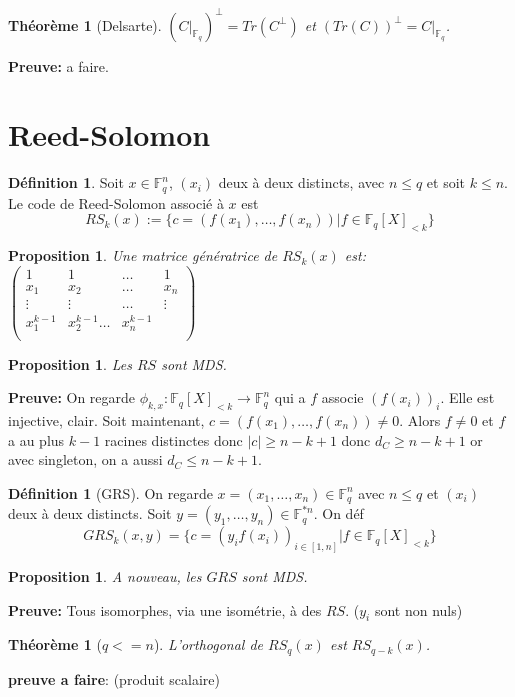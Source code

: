 \documentclass[12pt]{article}
\theoremstyle{plain}
\newtheorem{thm}[subsubsection]{Th\'eor\`eme}
\newtheorem{prop}[subsubsection]{Proposition}
\theoremstyle{definition}
\newtheorem{defn}[subsubsection]{D\'efinition}
\theoremstyle{remark}
\newcommand{\F}{\mathbb{F}}
\begin{document}
\begin{thm}[Delsarte]
    $(C|_{\F_q})^{\perp}=Tr(C^{\perp})$ et $(Tr(C))^{\perp}=C|_{\F_q}$.
\end{thm}
\textbf{Preuve:} a faire.

\section{Reed-Solomon}
\begin{defn}
    Soit $x\in \F_q^n$, $(x_i)$ deux à deux distincts, avec $n\leq q$ et soit $k\leq n$.
    Le code de Reed-Solomon associé à $x$ est 
    \[RS_k(x):=\{c=(f(x_1),\ldots,f(x_n))|f\in \F_q[X]_{<k}\}\]
\end{defn}
\begin{prop}
    Une matrice génératrice de $RS_k(x)$ est:
    $\begin{pmatrix}
        1 & 1&\ldots&1\\
        x_1&x_2&\ldots&x_n\\
        \vdots&\vdots&\ldots&\vdots\\
        x_1^{k-1} & x_2^{k-1}\ldots&x_n^{k-1}\\
    \end{pmatrix}$
\end{prop}

\begin{prop}
    Les $RS$ sont MDS.
\end{prop}
\textbf{Preuve:} On regarde $\phi_{k,x}:\F_q[X]_{<k}\to \F_q^n$ qui 
a $f$ associe $(f(x_i))_i$. Elle est injective, clair. 
Soit maintenant, $c=(f(x_1),\ldots,f(x_n))\ne 0$. Alors $f\ne 0$ et 
$f$ a au plus $k-1$ racines distinctes donc $|c|\geq n-k+1$ donc 
$d_C\geq n-k+1$ or avec singleton, on a aussi $d_C\leq n-k+1$.
\begin{defn}[GRS]
    On regarde $x=(x_1,\ldots, x_n)\in \F_q^n$ avec $n\leq q$
    et $(x_i)$ deux à deux distincts. Soit $y=(y_1,\ldots, y_n)\in\F_q^{*n}$.
    On déf \[GRS_k(x,y)=\{c=(y_if(x_i))_{i\in [1,n]}|f\in \F_q[X]_{<k}\}\]
\end{defn}
\begin{prop}
    A nouveau, les $GRS$ sont MDS.
\end{prop}
\textbf{Preuve:} Tous isomorphes, via une isométrie, à des $RS$. ($y_i$ sont non nuls)

\begin{thm}[$q<=n$]
    L'orthogonal de $RS_q(x)$ est $RS_{q-k}(x)$.
\end{thm}
\textbf{preuve a faire}: (produit scalaire)
\end{document}
